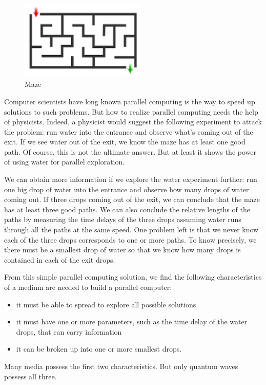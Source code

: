 \documentclass{book}
\begin{document}
\begin{figure}[ht]
\includegraphics[width=6cm]{pic/maze.png}
\caption{Maze}
\label{Maze}
\end{figure}

Computer scientists have long known parallel computing is the way to speed up solutions to such problems. But how to realize parallel computing needs the help of physicists. Indeed, a physicist would suggest the following experiment to attack the problem: run water into the entrance and observe what's coming out of the exit. If we see water out of the exit, we know the maze has at least one good path. Of course, this is not the ultimate answer. But at least it shows the power of using water for parallel exploration.

We can obtain more information if we explore the water experiment further: run one big drop of water into the entrance and observe how many drops of water coming out. If three drops coming out of the exit, we can conclude that the maze has at least three good paths. We can also conclude the relative lengths of the paths by measuring the time delays of the three drops assuming water runs through all the paths at the same speed. One problem left is that we never know each of the three drops corresponds to one or more paths. To know precisely, we there must be a smallest drop of water so that we know how many drops is contained in each of the exit drops.

From this simple parallel computing solution, we find the following characteristics of a medium are needed to build a parallel computer:
\begin{itemize}
    \item it must be able to spread to explore all possible solutions
    \item it must have one or more parameters, such as the time delay of the water drops, that can carry information
    \item it can be broken up into one or more smallest drops.
\end{itemize}
Many media possess the first two characteristics. But only quantum waves possess all three.
\end{document}
